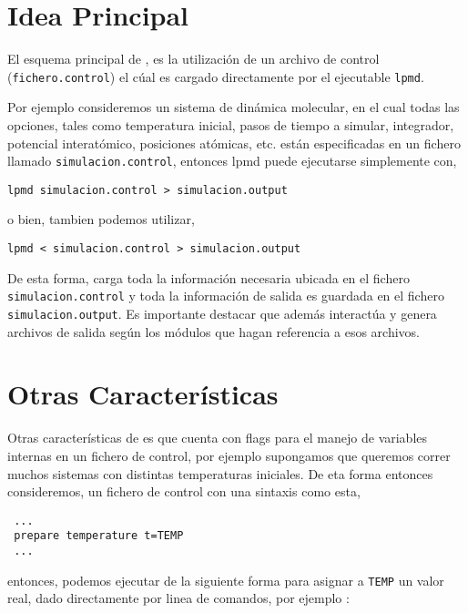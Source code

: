 \section{Idea Principal}

El esquema principal de \lpmd, es la utilizaci\'on de un archivo de control (\verb|fichero.control|) el c\'ual es cargado directamente por el ejecutable \verb|lpmd|.

Por ejemplo consideremos un sistema de din\'amica molecular, en el cual todas las opciones, tales como temperatura inicial, pasos de tiempo a simular, integrador, potencial interat\'omico, posiciones at\'omicas, etc. est\'an especificadas en un fichero llamado \verb|simulacion.control|, entonces lpmd puede ejecutarse simplemente con,

\begin{center}
 \texttt{lpmd simulacion.control > simulacion.output}
\end{center}

o bien, tambien podemos utilizar,

\begin{center}
 \texttt{lpmd < simulacion.control > simulacion.output}
\end{center}

De esta forma, \lpmd carga toda la informaci\'on necesaria ubicada en el fichero \verb|simulacion.control| y toda la informaci\'on de salida es guardada en el fichero \verb|simulacion.output|. Es importante destacar que \lpmd adem\'as interact\'ua y genera archivos de salida seg\'un los m\'odulos que hagan referencia a esos archivos.

\section{Otras Caracter\'isticas}

Otras caracter\'isticas de \lpmd es que cuenta con flags para el manejo de variables internas en un fichero de control, por ejemplo supongamos que queremos correr muchos sistemas con distintas temperaturas iniciales. De eta forma entonces consideremos, un fichero de control con una sintaxis como esta,

\begin{verbatim}
 ...
 prepare temperature t=TEMP
 ...
\end{verbatim}

entonces, podemos ejecutar \lpmd de la siguiente forma para asignar a \verb|TEMP| un valor real, dado directamente por linea de comandos, por ejemplo :

